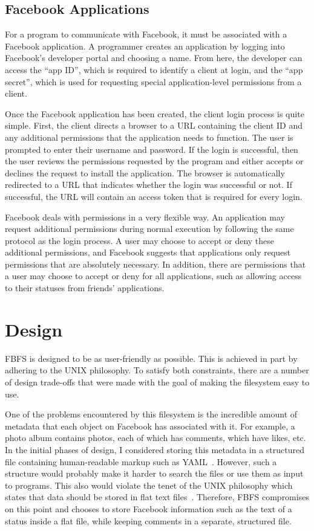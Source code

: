 \documentclass[11pt,twocolumn]{article}
\begin{document}
\subsection{Facebook Applications}
\label{subsec:facebookapplications}

For a program to communicate with Facebook, it must be associated with a
Facebook application. A programmer creates an application by logging into
Facebook's developer portal and choosing a name. From here, the developer can
access the ``app ID'', which is required to identify a client at login, and the
``app secret'', which is used for requesting special application-level
permissions from a client.

Once the Facebook application has been created, the client login process is
quite simple. First, the client directs a browser to a URL containing the
client ID and any additional permissions that the application needs to
function. The user is prompted to enter their username and password. If the
login is successful, then the user reviews the permissions requested by the
program and either accepts or declines the request to install the application.
The browser is automatically redirected to a URL that indicates whether the
login was successful or not. If successful, the URL will contain an access
token that is required for every login.

Facebook deals with permissions in a very flexible way. An application may
request additional permissions during normal execution by following the same
protocol as the login process. A user may choose to accept or deny these
additional permissions, and Facebook suggests that applications only request
permissions that are absolutely necessary. In addition, there are permissions
that a user may choose to accept or deny for all applications, such as allowing
access to their statuses from friends' applications.

\section{Design}
\label{sec:design}

FBFS is designed to be as user-friendly as possible. This is achieved in part
by adhering to the UNIX philosophy. To satisfy both constraints, there are a
number of design trade-offs that were made with the goal of making the
filesystem easy to use.

One of the problems encountered by this filesystem is the incredible amount of
metadata that each object on Facebook has associated with it. For example, a
photo album contains photos, each of which has comments, which have likes, etc.
In the initial phases of design, I considered storing this metadata in a
structured file containing human-readable markup such as YAML~\cite{yaml}.
However, such a structure would probably make it harder to search the files or
use them as input to programs. This also would violate the tenet of the UNIX
philosophy which states that data should be stored in flat text
files~\cite{Gancarz:1995:UP:193178}. Therefore, FBFS compromises on this point
and chooses to store Facebook information such as the text of a status inside a
flat file, while keeping comments in a separate, structured file.
\end{document}
